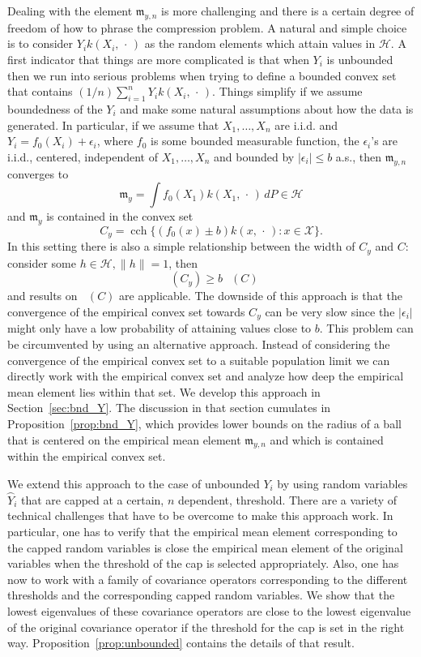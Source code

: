 \documentclass[AHL,Unicode,longabstracts,published]{cedram}
\theoremstyle{remark}
\DeclareMathOperator{\cch}{cch}
\DeclareMathOperator{\diamh}{{width}_h}
\newcommand{\X}{\mathcal{X}}
\newcommand{\cH}{\mathcal{H}}
\newcommand{\mean}{\mathfrak{m}}
\begin{document}
Dealing with the element $\mean_{y,n}$ is more challenging and there is a certain degree of freedom of how to phrase the compression problem. A natural and simple choice is to consider $Y_i k(X_i,\,\cdot\,)$ as the random elements which attain values in $\cH$. A first indicator that things are more complicated is that when $Y_i$ is unbounded then we run into serious problems when trying to define a bounded convex set that contains $(1/n) \sum_{i=1}^n Y_i k(X_i,\,\cdot\,)$. Things simplify if we assume boundedness of the $Y_i$ and make some natural assumptions about how the data is generated. In particular, if we assume that $X_1,\dots, X_n$ are i.i.d. and $Y_i = f_0(X_i) + \epsilon_i$, where $f_0$ is some bounded measurable function, the $\epsilon_i$'s are i.i.d., centered, independent of $X_1,\dots, X_n$ and bounded by $|\epsilon_i | \leq b$ a.s., then $\mean_{y,n}$ converges to
\[
\mean_y = \int f_0(X_1) k(X_1,\,\cdot\,) \, dP \in \cH
\]
and $\mean_y$ is contained in the convex set
\[
C_y = \cch \{ (f_0(x) \pm b) k(x,\,\cdot\,): x\in \X \}.
\]
In this setting there is also a simple relationship between the width of $C_y$ and $C$: consider some $h\in \cH, \|h\|=1$, then
\[
\diamh (C_y) \geq b \, \diamh(C)
\]
and results on $\diamh(C)$ are applicable. The downside of this approach is that the convergence of the empirical convex set towards $C_y$ can be very slow since the $|\epsilon_i|$ might only have a low probability of attaining values close to $b$. This problem can be circumvented by using an alternative approach. Instead of considering the convergence of the empirical convex set to a suitable population limit we can directly work with the empirical convex set and analyze how deep the empirical mean element lies within that set. We develop this approach in Section~\ref{sec:bnd_Y}. The discussion in that section cumulates in Proposition~\ref{prop:bnd_Y}, which provides lower bounds on the radius of a ball that is centered on the empirical mean element $\mean_{y,n}$ and which is contained within the empirical convex set.

We extend this approach to the case of unbounded $Y_i$ by using random variables~$\wideparen{Y}_i$ that are capped at a certain, $n$ dependent, threshold. There are a variety of technical challenges that have to be overcome to make this approach work. In particular, one has to verify that the empirical mean element corresponding to the capped random variables is close the empirical mean element of the original variables when the threshold of the cap is selected appropriately. Also, one has now to work with a family of covariance operators corresponding to the different thresholds and the corresponding capped random variables. We show that the lowest eigenvalues of these covariance operators are close to the lowest eigenvalue of the original covariance operator if the threshold for the cap is set in the right way. Proposition~\ref{prop:unbounded} contains the details of that result.
\end{document}
